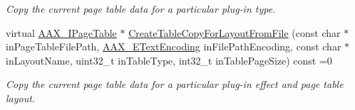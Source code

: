 \begin{DoxyCompactItemize}
\begin{DoxyCompactList}\small\item\em Copy the current page table data for a particular plug-\/in type. \end{DoxyCompactList}\item 
virtual \hyperlink{a00107}{A\+A\+X\+\_\+\+I\+Page\+Table} $\ast$ \hyperlink{a00090_ac4da662371586ea85720e941eba6d629}{Create\+Table\+Copy\+For\+Layout\+From\+File} (const char $\ast$in\+Page\+Table\+File\+Path, \hyperlink{a00206_a8152e57310850693e4e7f00fc4922d74}{A\+A\+X\+\_\+\+E\+Text\+Encoding} in\+File\+Path\+Encoding, const char $\ast$in\+Layout\+Name, uint32\+\_\+t in\+Table\+Type, int32\+\_\+t in\+Table\+Page\+Size) const =0
\begin{DoxyCompactList}\small\item\em Copy the current page table data for a particular plug-\/in effect and page table layout. \end{DoxyCompactList}\end{DoxyCompactItemize}
